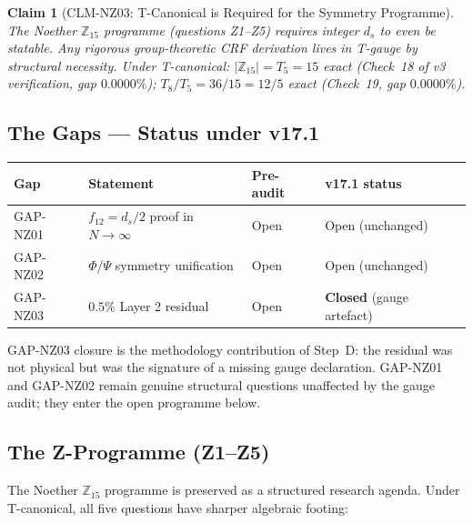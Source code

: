 \documentclass[12pt, a4paper]{article}
\newtheorem{claim}{Claim}[section]   %
\begin{document}
\begin{claim}[CLM-NZ03: T-Canonical is Required for the Symmetry Programme]
The Noether $\mathbb{Z}_{15}$ programme (questions Z1--Z5) requires
integer $d_s$ to even be statable. Any rigorous group-theoretic CRF
derivation lives in T-gauge by structural necessity. Under T-canonical:
$|\mathbb{Z}_{15}| = T_5 = 15$ exact (Check~18 of v3 verification,
gap $0.0000\%$); $T_8/T_5 = 36/15 = 12/5$ exact (Check~19,
gap $0.0000\%$).
\end{claim}

\subsection{The Gaps --- Status under v17.1}

\begin{center}
\renewcommand{\arraystretch}{1.30}
\begin{tabular}{p{1.2cm} p{6.5cm} p{2.0cm} p{2.5cm}}
\toprule
\textbf{Gap} & \textbf{Statement} & \textbf{Pre-audit} & \textbf{v17.1 status} \\
\midrule
GAP-NZ01 & $f_{12} = d_s/2$ proof in $N\to\infty$ & Open
         & Open (unchanged) \\
GAP-NZ02 & $\Phi$/$\Psi$ symmetry unification    & Open
         & Open (unchanged) \\
GAP-NZ03 & $0.5\%$ Layer 2 residual              & Open
         & \textbf{Closed} (gauge artefact) \\
\bottomrule
\end{tabular}
\end{center}

GAP-NZ03 closure is the methodology contribution of Step~D: the
residual was not physical but was the signature of a missing gauge
declaration. GAP-NZ01 and GAP-NZ02 remain genuine structural questions
unaffected by the gauge audit; they enter the open programme below.

\subsection{The Z-Programme (Z1--Z5)}

The Noether $\mathbb{Z}_{15}$ programme is preserved as a structured
research agenda. Under T-canonical, all five questions have sharper
algebraic footing:
\end{document}
